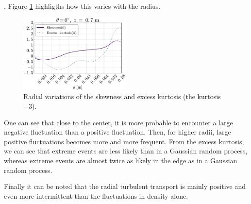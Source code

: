 .
Figure \cref{fig:skewKurt008} highligths how this varies with the radius.
%
\begin{figure}[htb]
    \centering
    \includegraphics[width=0.5\textwidth]{fig/results/skewKurt/008T}
    \caption{Radial variations of the skewness and excess kurtosis (the kurtosis $-3$).}
    \label{fig:skewKurt008}
\end{figure}
%
One can see that close to the center, it is more probable to encounter a large negative fluctuation than a positive fluctuation.
Then, for higher radii, large positive fluctuations becomes more and more frequent.
From the excess kurtosis, we can see that extreme events are less likely than in a Gaussian random process, whereas extreme events are almost twice as likely in the edge as in a Gaussian random process.

Finally it can be noted that the radial turbulent transport is mainly positive and even more intermittent than the fluctuations in density alone.

